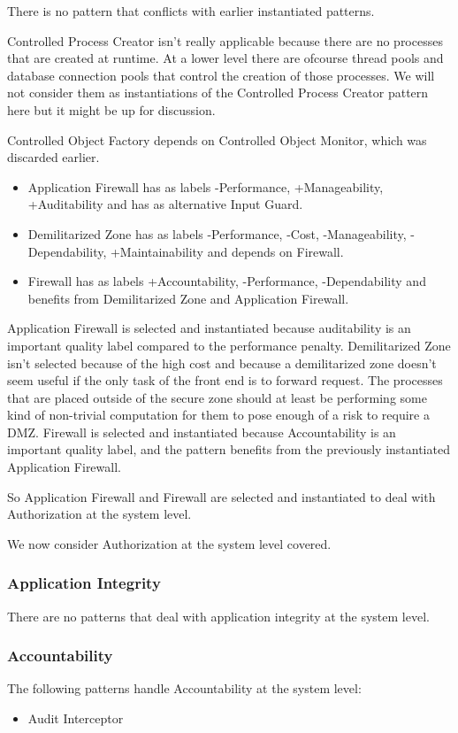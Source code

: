 \documentclass[a4paper,11pt]{report}
\begin{document}
There is no pattern that conflicts with earlier instantiated patterns.

Controlled Process Creator isn't really applicable because there are no processes that are created at runtime. At a lower level there are ofcourse thread pools and database connection pools that control the creation of those processes. We will not consider them as instantiations of the Controlled Process Creator pattern here but it might be up for discussion.

Controlled Object Factory depends on Controlled Object Monitor, which was discarded earlier.

\begin{itemize}
\item Application Firewall has as labels -Performance, +Manageability, +Auditability and has as alternative Input Guard.
\item Demilitarized Zone has as labels -Performance, -Cost, -Manageability, -Dependability, +Maintainability and depends
on Firewall.
\item Firewall has as labels +Accountability, -Performance, -Dependability and benefits from Demilitarized Zone and 
Application Firewall.
\end{itemize}

Application Firewall is selected and instantiated because auditability is an important quality label compared to
the performance penalty.
Demilitarized Zone isn't selected because of the high cost and because a demilitarized zone doesn't seem useful if the only task of the front end is to forward request. The processes that are placed outside of the secure zone should at least be performing some kind of non-trivial computation for them to pose enough of a risk to require a DMZ.
Firewall is selected and instantiated because Accountability is an important quality label, and the pattern benefits
from the previously instantiated Application Firewall.

So Application Firewall and Firewall are selected and instantiated to deal with Authorization at the system level.

We now consider Authorization at the system level covered.
\subsubsection{Application Integrity}
There are no patterns that deal with application integrity at the system level.

\subsubsection{Accountability}
The following patterns handle Accountability at the system level:
\begin{itemize}
\item Audit Interceptor
\end{itemize}
\end{document}
